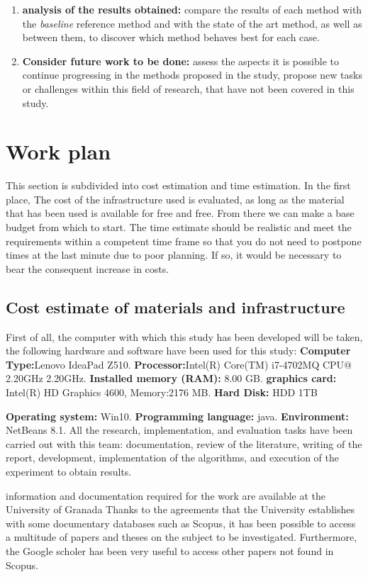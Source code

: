 \begin{enumerate}
    \item {\textbf{analysis of the results obtained:} compare the results of each method with the \textit{baseline} reference method and with the state of the art method, as well as between them, to discover which method behaves best for each case.}
    \item {\textbf{Consider future work to be done:} assess the aspects it is possible to continue progressing in the methods proposed in the study, propose new tasks or challenges within this field of research, that have not been covered in this study.}
\end{enumerate}

\section{Work plan}
This section is subdivided into cost estimation and time estimation. In the first place, The cost of the infrastructure used is evaluated, as long as the material that has been used is available for free and free. From there we can make a base budget from which to start. The time estimate should be realistic and meet the requirements within a competent time frame so that you do not need to postpone times at the last minute due to poor planning. If so, it would be necessary to bear the consequent increase in costs.
\subsection{Cost estimate of materials and infrastructure}
First of all, the computer with which this study has been developed will be taken, the following hardware and software have been used for this study:
\textbf{Computer Type:}Lenovo IdeaPad Z510.
\textbf{Processor:}Intel(R) Core(TM) i7-4702MQ CPU@ 2.20GHz 2.20GHz.
\textbf{Installed memory (RAM):} 8.00 GB.
\textbf{graphics card:} Intel(R) HD Graphics 4600, Memory:2176 MB.
\textbf{Hard Disk:} HDD 1TB

\textbf{Operating system:} Win10.
\textbf{Programming language:} java.
\textbf{Environment:}  NetBeans 8.1.
All the research, implementation, and evaluation tasks have been carried out with this team: documentation, review of the literature, writing of the report, development, implementation of the algorithms, and execution of the experiment to obtain results.

information and documentation required for the work are available  at the University of Granada  Thanks to the agreements that the University establishes with some documentary databases such as Scopus, it has been possible to access a multitude of papers and theses on the subject to be investigated. Furthermore, the Google scholer has been very useful to access other papers not found in Scopus.

